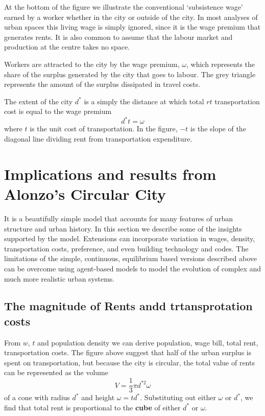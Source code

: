 At the bottom of the figure we illustrate the conventional `subsistence wage'  earned by a worker whether in the city or outside of the city.   In most analyses of urban spaces this living wage is simply ignored, since it is the wage premium that generates rents.  It is also common to assume that the labour market and production at the centre takes no space.   


Workers are attracted to the city by the wage premium, $\omega$,  which represents the share of the surplus generated by the city that goes to labour.  The grey triangle represents the amount of the surplus dissipated in travel costs.  

The extent  of the city  $d^*$ is a simply the distance at which total $rt$ transportation cost  is equal to the wage premium
\[d^* t= \omega\]
where $t$ is the unit cost of transportation. In the figure, $-t$ is the slope of the diagonal line dividing rent from transportation expenditure.



 \section{ Implications and results from Alonzo's Circular City}
 It is a beautifully simple model that accounts for many features of urban structure and urban history. In this section we describe some of the insights supported by the model. Extensions can incorporate variation in wages, density, transportation costs,  preference, and even building technology and codes. The limitations of the simple, continuous, equilibrium based versions described above can be overcome using agent-based models to model the evolution of complex and much more realistic urban systems. 

 \subsection{The magnitude of Rents andd trtansprotation costs}
 From $w$, $t$ and population density we can derive population, wage bill, total rent, transportation costs. The figure above suggest that  half of the urban surplus is spent on transportation, but because the city is circular, the total value of rents can be represented as the volume  \[ V=\frac{1}{3}\pi  d^{*2} \omega \]
of a cone with radius $d^*$ and  height $\omega = td^*$. Substituting out either  $\omega$ or  $d^*$, we find that total rent is  proportional to the \textbf{cube} of either  $d^*$ or $\omega$. 

